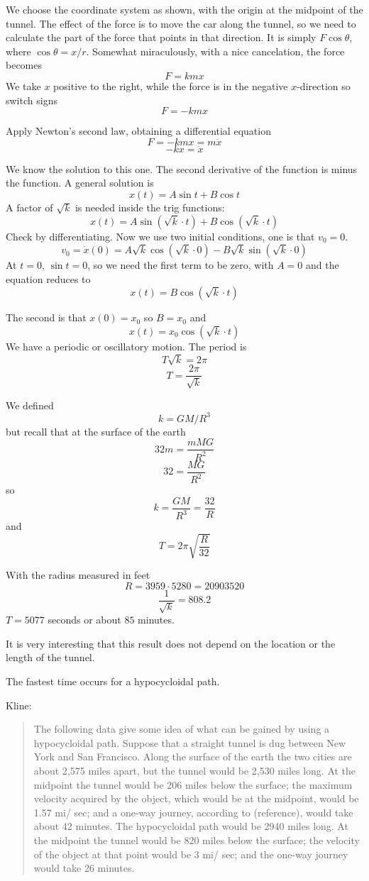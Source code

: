 \documentclass[11pt, oneside]{article}   	%
\begin{document}
We choose the coordinate system as shown, with the origin at the midpoint of the tunnel.  The effect of the force is to move the car along the tunnel, so we need to calculate the part of the force that points in that direction.  It is simply $F \cos \theta$, where $\cos \theta = x/r$.  Somewhat miraculously, with a nice cancelation, the force becomes
\[ F = kmx \]
We take $x$ positive to the right, while the force is in the negative $x$-direction so switch signs
\[ F = -kmx \]

Apply Newton's second law, obtaining a differential equation
\[ F = -kmx = m \ddot{x} \]
\[ -kx = \ddot{x} \]

We know the solution to this one.  The second derivative of the function is minus the function.  A general solution is
\[ x(t) = A \sin t + B \cos t \]
A factor of $\sqrt{k}$ is needed inside the trig functions:
\[ x(t) = A \sin (\sqrt{k} \cdot t) + B \cos (\sqrt{k} \cdot t) \]
Check by differentiating.  Now we use two initial conditions, one is that $v_0 = 0$.
\[ v_0 = \dot{x}(0) = A \sqrt{k} \cos (\sqrt{k} \cdot 0) - B \sqrt{k} \sin (\sqrt{k} \cdot 0) \]
At $t=0$, $\sin t = 0$, so we need the first term to be zero, with $A = 0$ and the equation reduces to
\[ x(t) =  B \cos (\sqrt{k} \cdot t) \]

The second is that $x(0) = x_0$ so $B = x_0$ and
\[ x(t) =  x_0 \cos (\sqrt{k} \cdot t ) \]
We have a periodic or oscillatory motion.  The period is
\[ T \sqrt{k}  = 2 \pi \]
\[ T = \frac{2 \pi}{\sqrt{k}} \]

We defined
\[ k = GM/R^3 \]
but recall that at the surface of the earth
\[ 32 m = \frac{mMG}{R^2} \]
\[ 32 = \frac{MG}{R^2} \]
so
\[ k = \frac{GM}{R^3} = \frac{32}{R} \]
and
\[ T = 2 \pi \sqrt{\frac{R}{32}} \]

With the radius measured in feet
\[ R = 3959 \cdot 5280  = 20903520 \]
\[ \frac{1}{\sqrt{k}} = 808.2 \]
$T = 5077$ seconds or about $85$ minutes.

It is very interesting that this result does not depend on the location or the length of the tunnel.

The fastest time occurs for a hypocycloidal path.

Kline: 

\begin{quote}The following data give some idea of what can be gained by using a hypocycloidal path. Suppose that a straight tunnel is dug between New York and San Francisco. Along the surface of the earth the two cities are about 2,575 miles apart, but the tunnel would be 2,530 miles long. At the midpoint the tunnel would be 206 miles below the surface; the maximum velocity acquired by the object, which would be at the midpoint, would be 1.57 mi/ sec; and a one-way journey, according to (reference), would take about 42 minutes. The hypocycloidal path would be 2940 miles long. At the midpoint the tunnel would be 820 miles below the surface; the velocity of the object at that point would be 3 mi/ sec; and the one-way journey would take 26 minutes.\end{quote}
\end{document}
